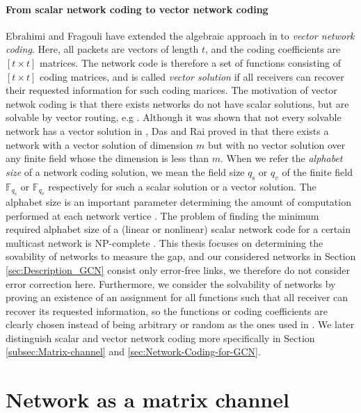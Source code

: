 \paragraph{From scalar network coding to vector network coding}

Ebrahimi and Fragouli \cite{Ebrahimi:2011} have extended the algebraic
approach in \cite{Koetter:2003} to \textit{vector network coding}.
Here, all packets are vectors of length $t$, and the coding coefficients
are $\left[t\times t\right]$ matrices. The network code is therefore
a set of functions consisting of $\left[t\times t\right]$ coding
matrices, and is called \textit{vector solution} if all receivers
can recover their requested information for such coding marices. The
motivation of vector netwok coding is that there exists networks do
not have scalar solutions, but are solvable by vector routing, e.g
\cite{Medard:2003}. Although it was shown that not every solvable
network has a vector solution in \cite[Lemma II.2]{Dougherty:2005},
Das and Rai proved in \cite{Das:2016} that there exists a network
with a vector solution of dimension $m$ but with no vector solution
over any finite field whose the dimension is less than $m$. When
we refer the \textit{alphabet size} of a network coding solution,
we mean the field size $q_{\mathrm{s}}$ or $q_{v}$ of the finite
field $\ensuremath{\mathbb{F}}_{q_{\mathrm{s}}}$ or $\ensuremath{\mathbb{F}}_{q_{v}}$
respectively for such a scalar solution or a vector solution. The
alphabet size is an important parameter determining the amount of
computation performed at each network vertice \cite{Wachter-Zeh:2018}.
The problem of finding the minimum required alphabet size of a (linear
or nonlinear) scalar network code for a certain multicast network
is NP-complete \cite{Langberg:2009,Lehman:2004,Gone:2018}. This thesis
focuses on determining the sovability of networks to measure the gap,
and our considered networks in Section \ref{sec:Description_GCN}
consist only error-free links, we therefore do not consider error
correction here. Furthermore, we consider the solvability of networks
by proving an existence of an assignment for all functions such that
all receiver can recover its requested information, so the functions
or coding coefficients are clearly chosen instead of being arbitrary
or random as the ones used in \cite{Ho:2003,Ahlswede:2000}. We later
distinguish scalar and vector network coding more specifically in
Section \ref{subsec:Matrix-channel} and \ref{sec:Network-Coding-for-GCN}.

\section{Network as a matrix channel \label{subsec:Matrix-channel}}

